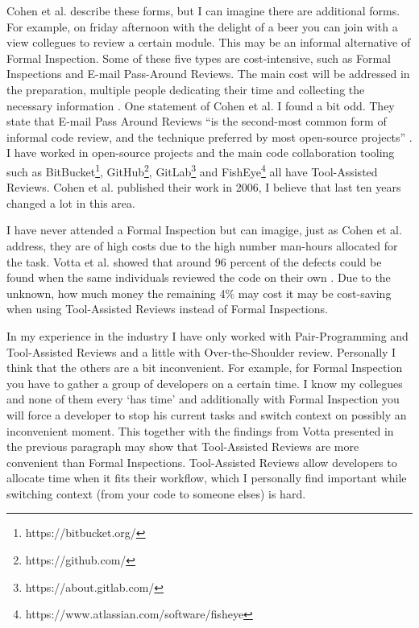 Cohen et al. describe these forms, but I can imagine there are additional forms.
For example, on friday afternoon with the delight of a beer you can join with a view collegues to review a certain module. This may be an informal alternative of Formal Inspection.
Some of these five types are cost-intensive, such as Formal Inspections and E-mail Pass-Around Reviews.
The main cost will be addressed in the preparation, multiple people dedicating their time and collecting the necessary information \autocite[23--38]{cohen2006best}.
One statement of Cohen et al. I found a bit odd.
They state that E-mail Pass Around Reviews ``is the second-most common form of informal code review, and the technique preferred by most open-source projects'' \autocite[30]{cohen2006best}.
I have worked in open-source projects and the main code collaboration tooling such as
BitBucket\footnote{https://bitbucket.org/},
GitHub\footnote{https://github.com/},
GitLab\footnote{https://about.gitlab.com/}
and FishEye\footnote{https://www.atlassian.com/software/fisheye}
all have Tool-Assisted Reviews.
Cohen et al. published their work in 2006, I believe that last ten years changed a lot in this area.

I have never attended a Formal Inspection but can imagige, just as Cohen et al. address, they are of high costs due to the high number man-hours allocated for the task.
Votta et al. showed that around 96 percent of the defects could be found when the same individuals reviewed the code on their own \autocite[110]{Votta:1993:INM:256428.167070}.
Due to the unknown, how much money the remaining 4\% may cost it may be cost-saving when using Tool-Assisted Reviews instead of Formal Inspections.

In my experience in the industry I have only worked with Pair-Programming and Tool-Assisted Reviews and a little with Over-the-Shoulder review. Personally I think that the others are a bit inconvenient.
For example, for Formal Inspection you have to gather a group of developers on a certain time.
I know my collegues and none of them every `has time' and
additionally with Formal Inspection you will force a developer to stop his current tasks and switch context on possibly an inconvenient moment.
This together with the findings from Votta presented in the previous paragraph may show that Tool-Assisted Reviews are more convenient than Formal Inspections.
Tool-Assisted Reviews allow developers to allocate time when it fits their workflow, which I personally find important while switching context (from your code to someone elses) is hard.

